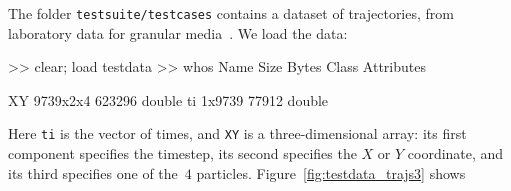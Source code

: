 \documentclass[12pt]{article}
\begin{document}
The folder \lstinline{testsuite/testcases} %
%
contains a dataset of trajectories, from laboratory data for granular
media~\citep{Puckett2012}.  We load the
data:
\begin{lstbraidlab}
>> clear; load testdata
>> whos
  Name         Size               Bytes  Class     Attributes

  XY        9739x2x4             623296  double
  ti           1x9739             77912  double
\end{lstbraidlab}
Here \lstinline{ti} is the vector of times, and \lstinline{XY} is a
three-dimensional array: its first component specifies the timestep,
its second specifies the $X$ or $Y$ coordinate, and its third
specifies one of the~$4$ particles.  Figure~\ref{fig:testdata_trajs3}
shows
%
\begin{figure}
\begin{center}
\hspace{1em}
\subfigure[]{
}
\end{center}
\end{figure}
\end{document}
